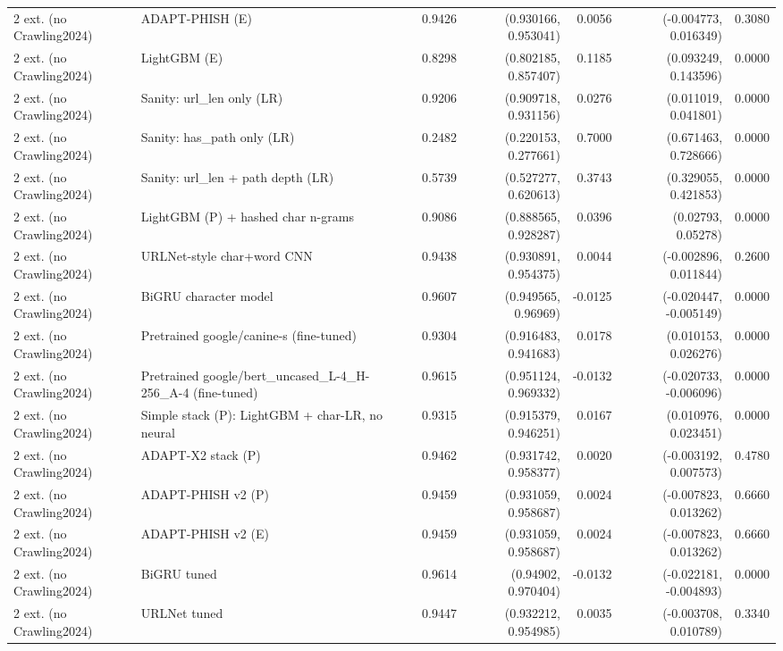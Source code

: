 \begin{table}[t]
\begin{tabular}{llrrrrr}
2 ext. (no Crawling2024) & ADAPT-PHISH (E) & 0.9426 & (0.930166, 0.953041) & 0.0056 & (-0.004773, 0.016349) & 0.3080 \\
2 ext. (no Crawling2024) & LightGBM (E) & 0.8298 & (0.802185, 0.857407) & 0.1185 & (0.093249, 0.143596) & 0.0000 \\
2 ext. (no Crawling2024) & Sanity: url\_len only (LR) & 0.9206 & (0.909718, 0.931156) & 0.0276 & (0.011019, 0.041801) & 0.0000 \\
2 ext. (no Crawling2024) & Sanity: has\_path only (LR) & 0.2482 & (0.220153, 0.277661) & 0.7000 & (0.671463, 0.728666) & 0.0000 \\
2 ext. (no Crawling2024) & Sanity: url\_len + path depth (LR) & 0.5739 & (0.527277, 0.620613) & 0.3743 & (0.329055, 0.421853) & 0.0000 \\
2 ext. (no Crawling2024) & LightGBM (P) + hashed char n-grams & 0.9086 & (0.888565, 0.928287) & 0.0396 & (0.02793, 0.05278) & 0.0000 \\
2 ext. (no Crawling2024) & URLNet-style char+word CNN & 0.9438 & (0.930891, 0.954375) & 0.0044 & (-0.002896, 0.011844) & 0.2600 \\
2 ext. (no Crawling2024) & BiGRU character model & 0.9607 & (0.949565, 0.96969) & -0.0125 & (-0.020447, -0.005149) & 0.0000 \\
2 ext. (no Crawling2024) & Pretrained google/canine-s (fine-tuned) & 0.9304 & (0.916483, 0.941683) & 0.0178 & (0.010153, 0.026276) & 0.0000 \\
2 ext. (no Crawling2024) & Pretrained google/bert\_uncased\_L-4\_H-256\_A-4 (fine-tuned) & 0.9615 & (0.951124, 0.969332) & -0.0132 & (-0.020733, -0.006096) & 0.0000 \\
2 ext. (no Crawling2024) & Simple stack (P): LightGBM + char-LR, no neural & 0.9315 & (0.915379, 0.946251) & 0.0167 & (0.010976, 0.023451) & 0.0000 \\
2 ext. (no Crawling2024) & ADAPT-X2 stack (P) & 0.9462 & (0.931742, 0.958377) & 0.0020 & (-0.003192, 0.007573) & 0.4780 \\
2 ext. (no Crawling2024) & ADAPT-PHISH v2 (P) & 0.9459 & (0.931059, 0.958687) & 0.0024 & (-0.007823, 0.013262) & 0.6660 \\
2 ext. (no Crawling2024) & ADAPT-PHISH v2 (E) & 0.9459 & (0.931059, 0.958687) & 0.0024 & (-0.007823, 0.013262) & 0.6660 \\
2 ext. (no Crawling2024) & BiGRU tuned & 0.9614 & (0.94902, 0.970404) & -0.0132 & (-0.022181, -0.004893) & 0.0000 \\
2 ext. (no Crawling2024) & URLNet tuned & 0.9447 & (0.932212, 0.954985) & 0.0035 & (-0.003708, 0.010789) & 0.3340 \\

\end{tabular}
\end{table}
